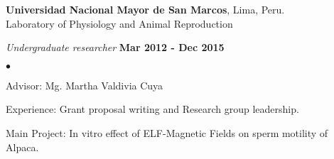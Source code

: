 \documentclass[margin,line]{res}
\newenvironment{list1}{
  \begin{list}{\ding{113}}{%
      \setlength{\itemsep}{0in}
      \setlength{\parsep}{0in} \setlength{\parskip}{0in}
      \setlength{\topsep}{0in} \setlength{\partopsep}{0in}
      \setlength{\leftmargin}{0.17in}}}{\end{list}}
\newenvironment{list2}{
  \begin{list}{$\bullet$}{%
      \setlength{\itemsep}{0in}
      \setlength{\parsep}{0in} \setlength{\parskip}{0in}
      \setlength{\topsep}{0in} \setlength{\partopsep}{0in}
      \setlength{\leftmargin}{0.2in}}}{\end{list}}
\begin{document}
\begin{resume}
{\bf Universidad Nacional Mayor de San Marcos}, Lima, Peru.\\
Laboratory of Physiology and Animal Reproduction\\
\vspace*{-.1in}
\begin{list1}
	\item[] {\em Undergraduate researcher} \hfill {\bf Mar 2012 - Dec 2015}\\
	\vspace*{-.1in}
	\begin{list2} %
		\item Advisor: Mg. Martha Valdivia Cuya
		\item Experience: Grant proposal writing and Research group leadership. %
		\item Main Project: In vitro effect of ELF-Magnetic Fields on sperm motility of Alpaca.\\ %
	\end{list2}
\end{list1}


\end{resume}
\end{document}

